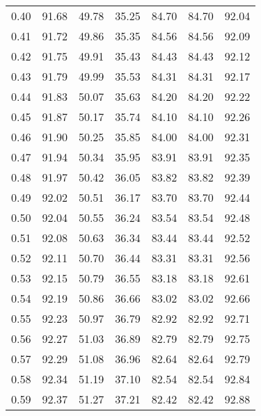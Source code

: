 \begin{tabular}{|c|c|c|c|c|c|c|}
      0.40 &     91.68 &     49.78 &      35.25 &   84.70 &      84.70 &         92.04 \\
      0.41 &     91.72 &     49.86 &      35.35 &   84.56 &      84.56 &         92.09 \\
      0.42 &     91.75 &     49.91 &      35.43 &   84.43 &      84.43 &         92.12 \\
      0.43 &     91.79 &     49.99 &      35.53 &   84.31 &      84.31 &         92.17 \\
      0.44 &     91.83 &     50.07 &      35.63 &   84.20 &      84.20 &         92.22 \\
      0.45 &     91.87 &     50.17 &      35.74 &   84.10 &      84.10 &         92.26 \\
      0.46 &     91.90 &     50.25 &      35.85 &   84.00 &      84.00 &         92.31 \\
      0.47 &     91.94 &     50.34 &      35.95 &   83.91 &      83.91 &         92.35 \\
      0.48 &     91.97 &     50.42 &      36.05 &   83.82 &      83.82 &         92.39 \\
      0.49 &     92.02 &     50.51 &      36.17 &   83.70 &      83.70 &         92.44 \\
      0.50 &     92.04 &     50.55 &      36.24 &   83.54 &      83.54 &         92.48 \\
      0.51 &     92.08 &     50.63 &      36.34 &   83.44 &      83.44 &         92.52 \\
      0.52 &     92.11 &     50.70 &      36.44 &   83.31 &      83.31 &         92.56 \\
      0.53 &     92.15 &     50.79 &      36.55 &   83.18 &      83.18 &         92.61 \\
      0.54 &     92.19 &     50.86 &      36.66 &   83.02 &      83.02 &         92.66 \\
      0.55 &     92.23 &     50.97 &      36.79 &   82.92 &      82.92 &         92.71 \\
      0.56 &     92.27 &     51.03 &      36.89 &   82.79 &      82.79 &         92.75 \\
      0.57 &     92.29 &     51.08 &      36.96 &   82.64 &      82.64 &         92.79 \\
      0.58 &     92.34 &     51.19 &      37.10 &   82.54 &      82.54 &         92.84 \\
      0.59 &     92.37 &     51.27 &      37.21 &   82.42 &      82.42 &         92.88 \\

\end{tabular}
